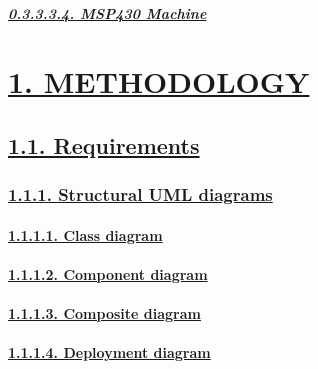 \documentclass[
]{article}
\begin{document}
\hypertarget{msp430-machine}{%
\subparagraph{\texorpdfstring{\protect\hyperlink{msp430-machine-1}{0.3.3.3.4.
MSP430 Machine}}{0.3.3.3.4. MSP430 Machine}}\label{msp430-machine}}

\hypertarget{methodology}{%
\section{\texorpdfstring{\protect\hyperlink{methodology-1}{1.
METHODOLOGY}}{1. METHODOLOGY}}\label{methodology}}

\hypertarget{requirements}{%
\subsection{\texorpdfstring{\protect\hyperlink{requirements-1}{1.1.
Requirements}}{1.1. Requirements}}\label{requirements}}

\hypertarget{structural-uml-diagrams}{%
\subsubsection{\texorpdfstring{\protect\hyperlink{structural-uml-diagrams-1}{1.1.1.
Structural UML
diagrams}}{1.1.1. Structural UML diagrams}}\label{structural-uml-diagrams}}

\hypertarget{class-diagram}{%
\paragraph{\texorpdfstring{\protect\hyperlink{class-diagram-1}{1.1.1.1.
Class diagram}}{1.1.1.1. Class diagram}}\label{class-diagram}}

\hypertarget{component-diagram}{%
\paragraph{\texorpdfstring{\protect\hyperlink{component-diagram-1}{1.1.1.2.
Component
diagram}}{1.1.1.2. Component diagram}}\label{component-diagram}}

\hypertarget{composite-diagram}{%
\paragraph{\texorpdfstring{\protect\hyperlink{composite-diagram-1}{1.1.1.3.
Composite
diagram}}{1.1.1.3. Composite diagram}}\label{composite-diagram}}

\hypertarget{deployment-diagram}{%
\paragraph{\texorpdfstring{\protect\hyperlink{deployment-diagram-1}{1.1.1.4.
Deployment
diagram}}{1.1.1.4. Deployment diagram}}\label{deployment-diagram}}
\end{document}
